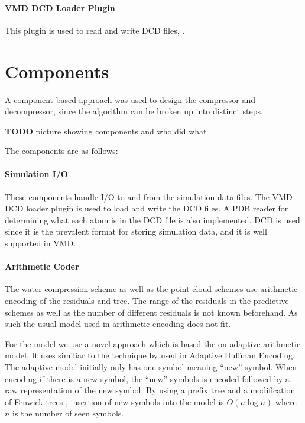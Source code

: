 \documentclass[a4paper]{report}
\newcommand{\todo}{\textbf{TODO} }
\begin{document}
\paragraph{VMD DCD Loader Plugin}
This plugin is used to read and write DCD files, \citep{vmd}.


\section{Components}
\label{sec:components}

A component-based approach was used to design the compressor and decompressor,
since the algorithm can be broken up into distinct steps.

\todo picture showing components and who did what

The components are as follows:

\paragraph{Simulation I/O}

These components handle I/O to and from the simulation data files. The VMD DCD
loader plugin is used to load and write the DCD files. A PDB reader for
determining what each atom is in the DCD file is also implemented. DCD is used
since it is the prevalent format for storing simulation data, and it is well
supported in VMD.


\paragraph{Arithmetic Coder}

The water compression scheme as well as the point cloud schemes use arithmetic
encoding of the residuals and tree. The range of the residuals in the
predictive schemes as well as the number of different residuals is not known
beforehand. As such the usual model used in arithmetic encoding does not
fit.

For the model we use a novel approach which is based the on adaptive
arithmetic model. It uses similiar to the technique by
\citet{cormack1984algorithms} used in Adaptive Huffman Encoding. The adaptive
model initially only has one symbol meaning ``new'' symbol. When encoding if
there is a new symbol, the ``new'' symbols is encoded followed by a raw
representation of the new symbol. By using a prefix tree and a modification of
Fenwick trees \citep{fenwick1994new}, insertion of new symbols into the model
is $O(n \log n)$ where $n$ is the number of seen symbols.
\end{document}
